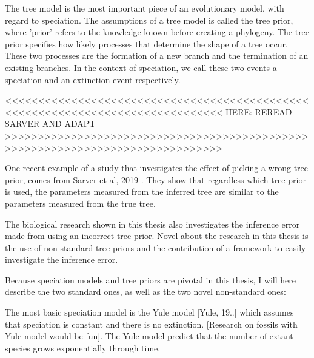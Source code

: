 %
%


The tree model is the most important piece of an evolutionary model,
with regard to speciation. The assumptions of a tree model is 
called the tree prior, where 'prior' refers to the knowledge
known before creating a phylogeny. The tree prior specifies how likely
processes that determine the shape of a tree occur. These
two processes are the formation of a new branch and the termination of
an existing branches. In the context of speciation, we call these
two events a speciation and an extinction event respectively.

%
%
%

<<<<<<<<<<<<<<<<<<<<<<<<<<<<<<<<<<<<<<<<<<<<<<<<<<<<<<<<<<<<<<<<<<<<<<<<<<<<<<<
HERE: REREAD SARVER AND ADAPT
>>>>>>>>>>>>>>>>>>>>>>>>>>>>>>>>>>>>>>>>>>>>>>>>>>>>>>>>>>>>>>>>>>>>>>>>>>>>>>>

One recent example of a study that investigates the effect of picking
a wrong tree prior, comes from Sarver et al, 2019 \cite{sarver2019choice}.
They show that regardless which tree prior is used, 
the parameters measured from the inferred tree are
similar to the parameters measured from the true tree.

The biological research shown in this thesis also investigates
the inference error made from using an incorrect tree prior.
Novel about the research in this thesis is the use of non-standard tree
priors and the contribution of a framework to easily investigate
the inference error.

Because speciation models and tree priors are pivotal in this thesis, 
I will here describe the two standard ones, as well as the two
novel non-standard ones:

The most basic speciation model
is the Yule model [Yule, 19..] which assumes that speciation
is constant and there is no extinction.
[Research on fossils with Yule model would be fun].
The Yule model predict that the number of extant species
grows exponentially through time.

